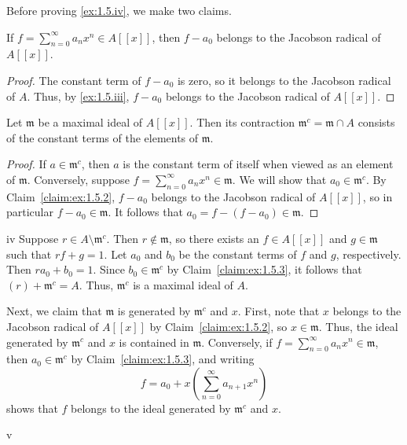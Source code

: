 Before proving \ref{ex:1.5.iv}, we make two claims.

\begin{claim}
\label{claim:ex:1.5.2}
If \(f = \sum_{n=0}^\infty a_n x^n \in A[[x]]\), then \(f - a_0\) belongs to the Jacobson radical of \(A[[x]]\).
\end{claim}

\begin{proof}
The constant term of \(f - a_0\) is zero, so it belongs to the Jacobson radical of \(A\).
Thus, by \ref{ex:1.5.iii}, \(f - a_0\) belongs to the Jacobson radical of \(A[[x]]\).
\end{proof}

\begin{claim}
\label{claim:ex:1.5.3}
Let \(\mathfrak{m}\) be a maximal ideal of \(A[[x]]\).
Then its contraction \(\mathfrak{m}^c = \mathfrak{m} \cap A\) consists of the constant terms of the elements of \(\mathfrak{m}\).
\end{claim}

\begin{proof}
If \(a \in \mathfrak{m}^c\), then \(a\) is the constant term of itself when viewed as an element of \(\mathfrak{m}\).
Conversely, suppose \(f = \sum_{n=0}^\infty a_n x^n \in \mathfrak{m}\).
We will show that \(a_0 \in \mathfrak{m}^c\).
By Claim~\ref{claim:ex:1.5.2}, \(f - a_0\) belongs to the Jacobson radical of \(A[[x]]\), so in particular \(f - a_0 \in \mathfrak{m}\).
It follows that \(a_0 = f - (f - a_0) \in \mathfrak{m}\).
\end{proof}

\begin{partsolution}{1}{5}{iv}
Suppose \(r \in A \setminus \mathfrak{m}^c\).
Then \(r \notin \mathfrak{m}\), so there exists an \(f \in A[[x]]\) and \(g \in \mathfrak{m}\) such that \(r f + g = 1\).
Let \(a_0\) and \(b_0\) be the constant terms of \(f\) and \(g\), respectively.
Then \(r a_0 + b_0 = 1\).
Since \(b_0 \in \mathfrak{m}^c\) by Claim~\ref{claim:ex:1.5.3}, it follows that \((r) + \mathfrak{m}^c = A\).
Thus, \(\mathfrak{m}^c\) is a maximal ideal of \(A\).

Next, we claim that \(\mathfrak{m}\) is generated by \(\mathfrak{m}^c\) and \(x\).
First, note that \(x\) belongs to the Jacobson radical of \(A[[x]]\) by Claim~\ref{claim:ex:1.5.2}, so \(x \in \mathfrak{m}\).
Thus, the ideal generated by \(\mathfrak{m}^c\) and \(x\) is contained in \(\mathfrak{m}\).
Conversely, if \(f = \sum_{n=0}^\infty a_n x^n \in \mathfrak{m}\), then \(a_0 \in \mathfrak{m}^c\) by Claim~\ref{claim:ex:1.5.3}, and writing
\begin{equation*}
f = a_0 + x \left(\sum_{n=0}^\infty a_{n+1} x^n\right)
\end{equation*}
shows that \(f\) belongs to the ideal generated by \(\mathfrak{m}^c\) and \(x\).
\end{partsolution}

\begin{partsolution}{1}{5}{v}

\end{partsolution}